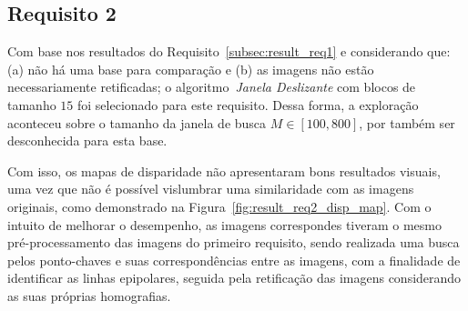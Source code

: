 \subsection{Requisito 2}
    \label{subsec:result_req2}
Com base nos resultados do Requisito~\ref{subsec:result_req1} e considerando que: (a) não há uma base para comparação e (b) as imagens não estão necessariamente retificadas; o algoritmo~\emph{Janela Deslizante} com blocos de tamanho $15$ foi selecionado para este requisito. Dessa forma, a exploração aconteceu sobre o tamanho da janela de busca $M \in [100, 800]$, por também ser desconhecida para esta base.

Com isso, os mapas de disparidade não apresentaram bons resultados visuais, uma vez que não é possível vislumbrar uma similaridade com as imagens originais, como demonstrado na Figura~\ref{fig:result_req2_disp_map}. Com o intuito de melhorar o desempenho, as imagens correspondes tiveram o mesmo pré-processamento das imagens do primeiro requisito, sendo realizada uma busca pelos ponto-chaves e suas correspondências entre as imagens, com a finalidade de identificar as linhas epipolares, seguida pela retificação das imagens considerando as suas próprias homografias.

